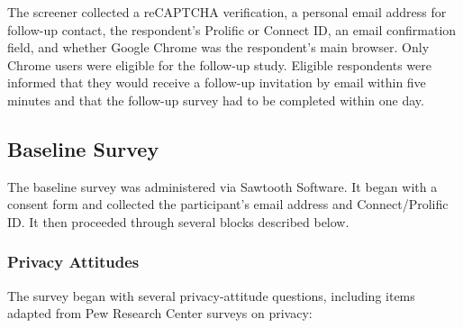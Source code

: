 \documentclass[12pt]{article}
\theoremstyle{definition}
\theoremstyle{remark}
\begin{document}
\begin{appendix}
The screener collected a reCAPTCHA verification, a personal email address for follow-up contact, the respondent's Prolific or Connect ID, an email confirmation field, and whether Google Chrome was the respondent's main browser. Only Chrome users were eligible for the follow-up study. Eligible respondents were informed that they would receive a follow-up invitation by email within five minutes and that the follow-up survey had to be completed within one day.

\subsection{Baseline Survey}\label{sec:baseline_survey}

The baseline survey was administered via Sawtooth Software. It began with a consent form and collected the participant's email address and Connect/Prolific ID. It then proceeded through several blocks described below.

\subsubsection{Privacy Attitudes}\label{sec:survey_privacy_attitudes}

The survey began with several privacy-attitude questions, including items adapted from Pew Research Center surveys on privacy:


\end{appendix}
\end{document}
